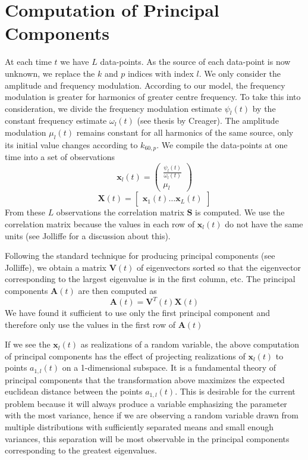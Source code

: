 \section{Computation of Principal Components}

At each time $t$ we have $L$ data-points. As the source of each data-point is
now unknown, we replace the $k$ and $p$ indices with index $l$. We only consider
the amplitude and frequency modulation. According to our model, the frequency
modulation is greater for harmonics of greater centre frequency. To take this
into consideration, we divide the frequency modulation estimate $\psi_{l}(t)$ by
the constant frequency estimate $\omega_{l}(t)$ (see thesis by Creager).  The amplitude modulation
$\mu_{l}(t)$ remains constant for all harmonics of the same source, only its initial value
changes according to $k_{60,p}$.  We compile the data-points at one time into a
set of observations
\begin{equation}
    \mathbf{x}_{l}(t) = \begin{pmatrix}
        \frac{\psi_{l}(t)}{\omega_{l}(t)} \\
        \mu_{l}
    \end{pmatrix}
\end{equation}
\begin{equation}
    \mathbf{X}(t) = \begin{bmatrix}
        \mathbf{x}_{1}(t) \ldots \mathbf{x}_{L}(t)
    \end{bmatrix}
\end{equation}
From these $L$ observations the correlation matrix $\mathbf{S}$ is computed. We
use the correlation matrix because the values in each row of $\mathbf{x}_{l}(t)$ do
not have the same units (see Jolliffe for a discussion about this). 

Following the standard technique for producing principal components (see
Jolliffe), we obtain a matrix $\mathbf{V}(t)$ of eigenvectors sorted so that the
eigenvector corresponding to the largest eigenvalue is in the first column, etc.
The principal components $\mathbf{A}(t)$ are then computed as
\begin{equation}
    \mathbf{A}(t) = \mathbf{V}^{T}(t)\mathbf{X}(t)
\end{equation}
We have found it sufficient to use only the first principal component and
therefore only use the values in the first row of $\mathbf{A}(t)$

If we see the $\mathbf{x}_{l}(t)$ as realizations of a random variable, the
above computation of principal components has the effect of projecting
realizations of $\mathbf{x}_{l}(t)$ to points $a_{1,l}(t)$ on a 1-dimensional
subspace. It is a fundamental theory of principal components that the
transformation above maximizes the expected euclidean distance between the
points $a_{1,l}(t)$. This is desirable for the current problem because it will
always produce a variable emphasizing the parameter with the most variance,
hence if we are observing a random variable drawn from multiple distributions
with sufficiently separated means and small enough variances, this separation
will be most observable in the principal components corresponding to the
greatest eigenvalues.


